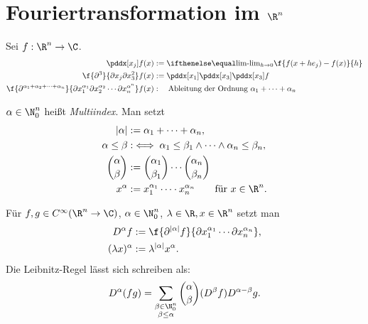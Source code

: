 \section{Fouriertransformation im \texorpdfstring{$\R^n$}{R\textasciicircum n}}


\begin{nt*}[Erinnerung]
	Sei $f : \R^n \to \C$.
	\begin{align*}
		\pddx[x_j] f(x) &:= \lim_{h\to 0} \f {f(x+he_j)-f(x)}{h} \\
		\f{\partial^3 }{\partial x_j \partial x_3^2}f(x) &:= \pddx[x_1] \pddx[x_3] \pddx[x_3] f \\
		\f{\partial^{\alpha_1 + \alpha_2 + \dotsb + \alpha_n} }{\partial x_1^{\alpha_1} \partial x_2^{\alpha_2} \dotsb \partial x_n^{\alpha^n}}f(x)  &: \quad \text{Ableitung der Ordnung $\alpha_1 + \dotsb + \alpha_n$}
	\end{align*}
\end{nt*}

\begin{df} \label{4.27}
	$\alpha \in \N_0^n$ heißt \emph{Multiindex}.
	Man setzt
	\begin{align*}
		|\alpha| &:= \alpha_1 + \dotsb + \alpha_n, \\
		\alpha \le \beta &:\iff \alpha_1 \le \beta_1 \land \dotsb \land \alpha_n \le \beta_n, \\
		\binom{\alpha}{\beta} &:= \binom{\alpha_1}{\beta_1}  \dotsb \binom{\alpha_n}{\beta_n} \\
		x^\alpha &:= x_1^{\alpha_1}  \dotsb \cdot x_n^{\alpha_n} \qquad \text{für $x\in \R^n$.}
	\end{align*}
\end{df}

\begin{ex}[Anwendung] \label{4.28}
	Für $f, g \in C^\infty (\R^n \to \C)$, $\alpha \in \N_0^n$, $\lambda \in \R, x \in \R^n$ setzt man
	\begin{align*}
		D^\alpha f &:= \f {\partial^{|\alpha|}f}{\partial x_1^{\alpha_1} \dotsb \partial x_n^{\alpha_n}},\\
		(\lambda x)^\alpha &:= \lambda^{|\alpha|} x^\alpha.
	\end{align*}
	Die Leibnitz-Regel lässt sich schreiben als:
	\[
		D^\alpha(f g) = \sum_{\substack{\beta \in \N_0^n \\ \beta \le \alpha}} \binom{\alpha}{\beta} (D^\beta f)D^{\alpha - \beta} g.
	\]
\end{ex}


